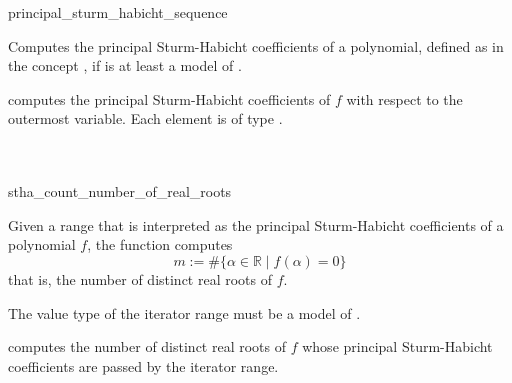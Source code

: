 \begin{ccRefFunction}{principal_sturm_habicht_sequence}
\ccDefinition

Computes the principal Sturm-Habicht coefficients
of a polynomial, defined as in the concept 
, 
if 
is at least a model of .

\ccOperations
{}
         { computes the principal Sturm-Habicht coefficients of $f$
           with respect to the outermost variable. Each element is of type
           .}
\ccSeeAlso
{}\\
\\
\\
\end{ccRefFunction}

\begin{ccRefFunction}{stha_count_number_of_real_roots}
\ccDefinition

Given a range that is interpreted as the principal Sturm-Habicht coefficients
of a polynomial $f$, the function computes
$$m:=\# \{\alpha\in\mathbb{R}\mid f(\alpha)=0\}$$
that is, the number of distinct real roots of $f$.

The value type of the iterator range must be a model of .

\ccOperations
{}
         { computes the number of distinct real roots of $f$ whose principal Sturm-Habicht coefficients are passed by the iterator range.}
\ccSeeAlso
{}\\
\\
\\
\end{ccRefFunction}
